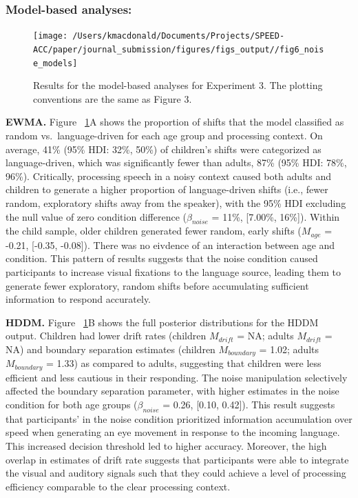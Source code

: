\documentclass[english,floatsintext,man]{apa6}
\begin{document}
\hypertarget{model-based-analyses-2}{%
\subsubsection{Model-based analyses:}\label{model-based-analyses-2}}

\begin{figure}[!t]

{\centering \texttt{[image: /Users/kmacdonald/Documents/Projects/SPEED-ACC/paper/journal\_submission/figures/figs\_output//fig6\_noise\_models]} 

}

\caption{Results for the model-based analyses for Experiment 3. The plotting conventions are the same as Figure 3.}\label{fig:noise-model-plots}
\end{figure}

\textbf{EWMA.} Figure ~\ref{fig:noise-model-plots}A shows the proportion
of shifts that the model classified as random vs.~language-driven for
each age group and processing context. On average, 41\% (95\% HDI: 32\%,
50\%) of children's shifts were categorized as language-driven, which
was significantly fewer than adults, 87\% (95\% HDI: 78\%, 96\%).
Critically, processing speech in a noisy context caused both adults and
children to generate a higher proportion of language-driven shifts
(i.e., fewer random, exploratory shifts away from the speaker), with the
95\% HDI excluding the null value of zero condition difference
(\(\beta_{noise}\) = 11\%, {[}7.00\%, 16\%{]}). Within the child sample,
older children generated fewer random, early shifts (\(M_{age}\) =
-0.21, {[}-0.35, -0.08{]}). There was no eivdence of an interaction
between age and condition. This pattern of results suggests that the
noise condition caused participants to increase visual fixations to the
language source, leading them to generate fewer exploratory, random
shifts before accumulating sufficient information to respond accurately.

\textbf{HDDM.} Figure ~\ref{fig:noise-model-plots}B shows the full
posterior distributions for the HDDM output. Children had lower drift
rates (children \(M_{drift}\) = NA; adults \(M_{drift}\) = NA) and
boundary separation estimates (children \(M_{boundary}\) = 1.02; adults
\(M_{boundary}\) = 1.33) as compared to adults, suggesting that children
were less efficient and less cautious in their responding. The noise
manipulation selectively affected the boundary separation parameter,
with higher estimates in the noise condition for both age groups
(\(\beta_{noise}\) = 0.26, {[}0.10, 0.42{]}). This result suggests that
participants' in the noise condition prioritized information
accumulation over speed when generating an eye movement in response to
the incoming language. This increased decision threshold led to higher
accuracy. Moreover, the high overlap in estimates of drift rate suggests
that participants were able to integrate the visual and auditory signals
such that they could achieve a level of processing efficiency comparable
to the clear processing context.
\end{document}
